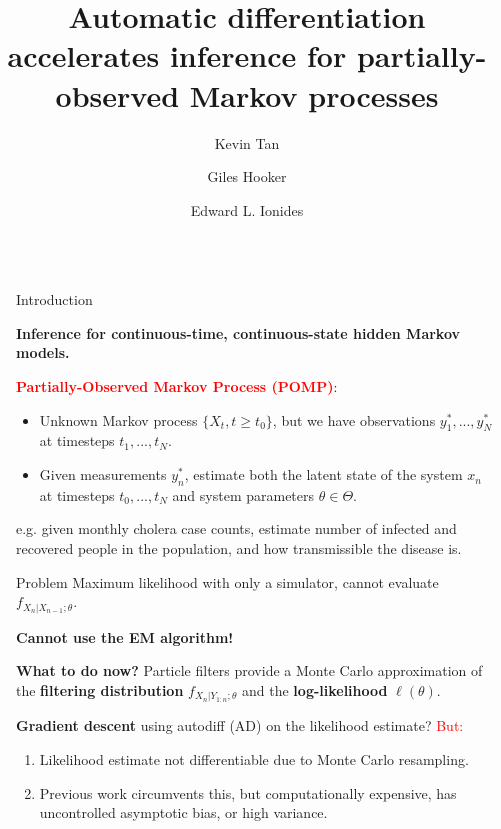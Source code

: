 \documentclass[final]{beamer}
\title{Automatic differentiation accelerates inference
for partially-observed Markov processes}
\author{Kevin Tan \inst{*} \and Giles Hooker \inst{*} \and Edward L. Ionides \inst{\cross[.4pt]$\cdot$}}
\institute[shortinst]{\inst{*} Department of Statistics and Data Science, University of Pennsylvania \quad  \inst{\cross[.4pt]} Department of Statistics, University of Michigan}
\newlength{\sepwidth}
\newlength{\colwidth}
\newcommand{\separatorcolumn}{\begin{column}{\sepwidth}\end{column}}
\begin{document}
\begin{frame}[t]
\begin{columns}[t]
\separatorcolumn

\begin{column}{\colwidth}

  \begin{block}{Introduction}
  
\textbf{Inference for continuous-time, continuous-state hidden Markov models.}

\begin{tcolorbox}[enhanced,colback=white!100!white,colframe=red!100!red]
\textbf{\textcolor{red}{Partially-Observed Markov Process (POMP)}}: 
\begin{itemize}
    \item Unknown Markov process $\{X_t, t \geq t_0\}$, but we have observations $y_1^*,...,y_N^*$ at timesteps $t_1,..., t_N$.  
    \item Given measurements $y_n^*$, estimate both the latent state of the system $x_n$ at timesteps $t_0,...,t_N$ and system parameters $\theta \in \Theta$. 
\end{itemize}
\end{tcolorbox}
e.g. given monthly cholera case counts, estimate number of infected and recovered people in the population, and how transmissible the disease is. 

  \end{block}
  
  \begin{block}{Problem}
  Maximum likelihood with only a simulator, cannot evaluate $f_{X_n|X_{n-1};\theta}$.

  \begin{tcolorbox}[enhanced,colback=white!100!white,colframe=red!100!red]
  \begin{center}
      \textbf{Cannot use the EM algorithm!}
  \end{center}
\end{tcolorbox}

  \textbf{What to do now?} Particle filters provide a Monte Carlo approximation of the \textbf{filtering distribution} $f_{X_n|Y_{1:n};\theta}$ and the \textbf{log-likelihood} $\ell(\theta)$.
  
  \textbf{Gradient descent} using autodiff (AD) on the likelihood estimate? \textcolor{red}{But:}
  \begin{enumerate}
      \item Likelihood estimate not differentiable due to Monte Carlo resampling.
      \item Previous work \cite{corenflos21, naesseth18, scibior21} circumvents this, but computationally expensive, has uncontrolled asymptotic bias, or high variance. 
  \end{enumerate}
  \end{block}
  

\end{column}
\end{columns}
\end{frame}
\end{document}
